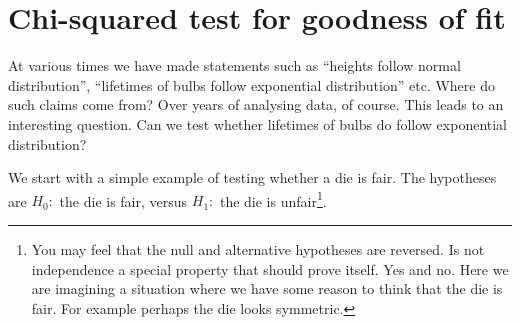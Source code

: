 \documentclass[preprint,  11pt]{amsart}
\newcommand{\para}[1]{\vspace{4mm}\noindent{\bfseries #1:}}
\theoremstyle{plain} %
\theoremstyle{definition} %
\begin{document}


%


\section{Chi-squared test for goodness of fit}
At various times we have made statements such as ``heights follow normal distribution'', ``lifetimes of bulbs follow exponential distribution'' etc. Where do such claims come from? Over years of analysing data, of course. This leads to an interesting question. Can we test whether  lifetimes of bulbs do follow exponential distribution? 

We start with a simple example of testing whether a die is fair.  The hypotheses are  $H_{0}:$ the die is fair, versus $H_{1}:$ the die is unfair\footnote{You may feel that the null and alternative hypotheses are reversed. Is not independence a special property that should prove itself. Yes and no. Here we are imagining a situation where we have some reason to think that the die is fair. For example perhaps the die looks symmetric.}.
\end{document}
